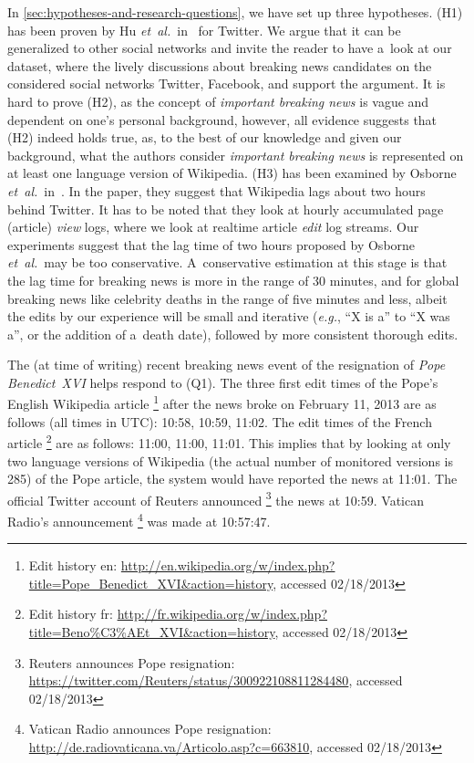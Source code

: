 In \autoref{sec:hypotheses-and-research-questions},
we have set up three hypotheses.
(H1) has been proven by Hu \emph{et~al.}\ in~\cite{hu2012breakingnews} for Twitter.
We argue that it can be generalized to other social networks
and invite the reader to have a~look at our dataset,
where the lively discussions about breaking news candidates
on the considered social networks Twitter, Facebook, and \googleplus
support the argument.
It is hard to prove (H2), as the concept of \emph{important breaking news}
is vague and dependent on one's personal background, however,
all evidence suggests that (H2) indeed holds true,
as, to the best of our knowledge and given our background,
what the authors consider \emph{important breaking news}
is represented on at least one language version of Wikipedia.
(H3) has been examined by Osborne \emph{et~al.}\ in~\cite{osborne2012bieber}.
In the paper, they suggest that Wikipedia lags about two hours behind Twitter.
It has to be noted that they look at hourly accumulated page (article) \emph{view} logs,
where we look at realtime article \emph{edit} log streams.
Our experiments suggest that the lag time of two hours
proposed by Osborne \emph{et~al.}\ may be too conservative. 
A~conservative estimation at this stage is that the lag time
for breaking news is more in the range of 30 minutes,
and for global breaking news like celebrity deaths
in the range of five minutes and less,
albeit the edits by our experience will be small and iterative
(\emph{e.g.}, ``X is a'' to ``X was a'', or the addition of a~death date),
followed by more consistent thorough edits.

The (at time of writing) recent breaking news event
of the resignation of \emph{Pope Benedict~XVI} helps respond to (Q1).
The three first edit times of the Pope's English Wikipedia article%
\footnote{Edit history en: \url{http://en.wikipedia.org/w/index.php?title=Pope_Benedict_XVI&action=history},
accessed 02/18/2013}
after the news broke on February 11, 2013 are as follows
(all times in UTC): 10:58, 10:59, 11:02.
The edit times of the French article%
\footnote{Edit history fr: \url{http://fr.wikipedia.org/w/index.php?title=Beno\%C3\%AEt_XVI&action=history}, accessed 02/18/2013}
are as follows: 11:00, 11:00, 11:01.
This implies that by looking at only two language versions of Wikipedia
(the actual number of monitored versions is 285) of the Pope article,
the system would have reported the news at 11:01.
The official Twitter account of Reuters announced%
\footnote{Reuters announces Pope resignation: \url{https://twitter.com/Reuters/status/300922108811284480},
accessed 02/18/2013} the news at 10:59.
Vatican Radio's announcement%
\footnote{Vatican Radio announces Pope resignation: \url{http://de.radiovaticana.va/Articolo.asp?c=663810},
accessed 02/18/2013} was made at 10:57:47.

